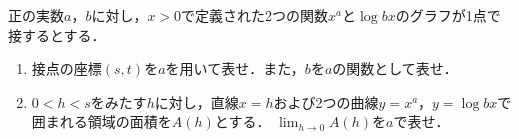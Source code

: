 \documentclass[../../main.tex]{subfiles}
\begin{document}
正の実数$a$，$b$に対し，$x>0$で定義された2つの関数$x^a$と$\log bx$のグラフが1点で接するとする．
\begin{enumerate}
  \item 接点の座標$(s,t)$を$a$を用いて表せ．また，$b$を$a$の関数として表せ．
  \item $0<h<s$をみたす$h$に対し，直線$x=h$および2つの曲線$y=x^a$，$y=\log bx$で囲まれる領域の面積を$A(h)$とする．
    $\displaystyle\lim_{h \to 0}A(h)$を$a$で表せ．
\end{enumerate}
\end{document}
